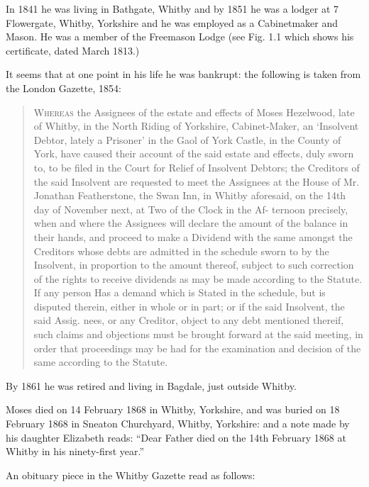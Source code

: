 In 1841 he was living in Bathgate, Whitby \cite{MHezelwood1841} and by 1851 he was a lodger at 7 Flowergate, Whitby, Yorkshire and he was employed as a Cabinetmaker and Mason.\cite{MHezelwood1851}  He was a member of the Freemason Lodge (see Fig. 1.1 which shows his certificate, dated March 1813.)

It seems that at one point in his life he was bankrupt: the following is taken from the London Gazette, 1854:\cite{MHezelwoodBankruptcy}

\begin{quotation}
\textsc{Whereas} the Assignees of the estate and effects of Moses Hezelwood, late of Whitby, in the North Riding of Yorkshire, Cabinet-Maker, an `Insolvent Debtor, lately a Prisoner' in the Gaol of York Castle, in the County of York, have caused their account of the said estate and effects, duly sworn to, to be filed in the Court for Relief of Insolvent Debtors; the Creditors of the said Insolvent are requested to meet the Assignees at the House of Mr. Jonathan Featherstone, the Swan Inn, in Whitby aforesaid, on the 14th day of November next, at Two of the Clock in the Af- ternoon precisely, when and where the Assignees will declare the amount of the balance in their hands, and proceed to make a Dividend with the same amongst the Creditors whose debts are admitted in the schedule sworn to by the Insolvent, in proportion to the amount thereof, subject to such correction of the rights to receive dividends as may be made according to the Statute. If any person Has a demand which is Stated in the schedule, but is disputed therein, either in whole or in part; or if the said Insolvent, the said Assig. nees, or any Creditor, object to any debt mentioned thereif, such claims and objections must be brought forward at the said meeting, in order that proceedings may be had for the examination and decision of the same according to the Statute.
\end{quotation}

By 1861 he was retired and living in Bagdale, just outside Whitby. \cite{MHezelwood1861}

Moses died on 14 February 1868 in Whitby, Yorkshire, and was buried on 18 February 1868 in Sneaton Churchyard,	Whitby, Yorkshire: \cite{MHezelwoodDeath} and a note made by his daughter Elizabeth reads: ``Dear Father died on the 14th February 1868 at Whitby in his ninety-first year.''

An obituary piece in the Whitby Gazette read as follows:\cite{MHezelwoodDeathnotice}

